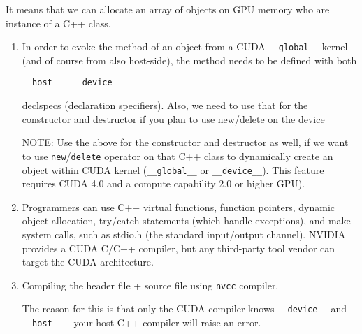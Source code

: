 It means that we can allocate an array of objects on GPU memory who are instance
of a C++ class.
\begin{enumerate}
  
  \item  In order to evoke the method of an object from a CUDA \verb!__global__!
  kernel (and of course from also host-side), the method
needs to be defined with both
\begin{verbatim}
__host__  __device__ 
\end{verbatim}
declspecs (declaration specifiers). Also, we need to use that for 
the constructor and destructor if you plan to use new/delete on the device

NOTE: Use the above for the constructor and destructor as well, if we want to
use  \verb!new!/\verb!delete! operator on that C++ class to dynamically create
an object within CUDA kernel (\verb!__global__! or \verb!__device__!). This feature requires
CUDA 4.0 and a compute capability 2.0 or higher  GPU).

  \item Programmers can use C++ virtual functions, function pointers, dynamic object
allocation, try/catch statements (which handle exceptions), and make system
calls, such as stdio.h (the standard input/output channel). NVIDIA provides a
CUDA C/C++ compiler, but any third-party tool vendor can target the CUDA
architecture.

  
  \item Compiling the header file + source file using \verb!nvcc! compiler.
  
  The reason for this is that only the CUDA compiler knows \verb!__device__! and
  \verb!__host__! -- your host C++ compiler will raise an error.
\end{enumerate}

